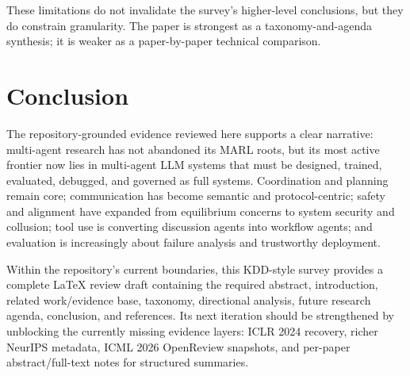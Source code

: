 \documentclass[11pt]{article}
\begin{document}
These limitations do not invalidate the survey's higher-level conclusions, but they do constrain granularity. The paper is strongest as a taxonomy-and-agenda synthesis; it is weaker as a paper-by-paper technical comparison.

\section{Conclusion}
The repository-grounded evidence reviewed here supports a clear narrative: multi-agent research has not abandoned its MARL roots, but its most active frontier now lies in multi-agent LLM systems that must be designed, trained, evaluated, debugged, and governed as full systems. Coordination and planning remain core; communication has become semantic and protocol-centric; safety and alignment have expanded from equilibrium concerns to system security and collusion; tool use is converting discussion agents into workflow agents; and evaluation is increasingly about failure analysis and trustworthy deployment.

Within the repository's current boundaries, this KDD-style survey provides a complete LaTeX review draft containing the required abstract, introduction, related work/evidence base, taxonomy, directional analysis, future research agenda, conclusion, and references. Its next iteration should be strengthened by unblocking the currently missing evidence layers: ICLR 2024 recovery, richer NeurIPS metadata, ICML 2026 OpenReview snapshots, and per-paper abstract/full-text notes for structured summaries.
\end{document}
